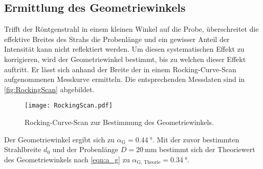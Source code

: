 \subsection{Ermittlung des Geometriewinkels}
Trifft der Röntgenstrahl in einem kleinen Winkel auf die Probe, überschreitet die effektive Breites des Strahs die Probenlänge und ein 
gewisser Anteil der Intensität kann nicht reflektiert werden. Um diesen systematischen Effekt zu korrigieren, wird der Geometriewinkel bestimmt, bis zu welchen dieser 
Effekt auftritt. Er lässt sich anhand der Breite der in einem Rocking-Curve-Scan aufgenommenen Messkurve ermitteln.
Die entsprechenden Messdaten sind in \autoref{fig:RockingScan} abgebildet.
\begin{figure}
  \centering
  \texttt{[image: RockingScan.pdf]}
  \caption{Rocking-Curve-Scan zur Bestimmung des Geometriewinkels.}
  \label{fig:RockingScan}
\end{figure}
Der Geometriewinkel ergibt sich zu $\alpha_\text{G} = \qty{0.44}{\degree}$. Mit der zuvor bestimmten Strahlbreite $d_0$ und der Probenlänge $D = \qty{20}{\milli\metre}$ bestimmt 
sich der Theoriewert des Geometriewinkels nach \autoref{eqn:a_g} zu $\alpha_\text{G, Theorie} = \qty{0.34}{\degree}$.

